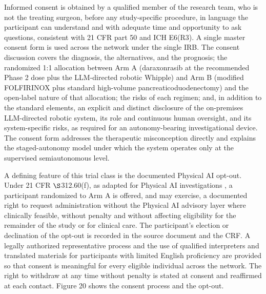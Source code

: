 Informed consent is obtained by a qualified member of the research team, who is not
the treating surgeon, before any study-specific procedure, in language the
participant can understand and with adequate time and opportunity to ask questions,
consistent with 21 CFR part 50 \cite{ecfr2026part50} and ICH E6(R3). A single
master consent form is used across the network under the single IRB. The consent
discussion covers the diagnosis, the alternatives, and the prognosis; the
randomized 1:1 allocation between Arm A (daraxonrasib at the recommended Phase 2
dose plus the LLM-directed robotic Whipple) and Arm B (modified FOLFIRINOX plus
standard high-volume pancreaticoduodenectomy) and the open-label nature of that
allocation; the risks of each regimen; and, in addition to the standard elements,
an explicit and distinct disclosure of the on-premises LLM-directed robotic system,
its role and continuous human oversight, and its system-specific risks, as required
for an autonomy-bearing investigational device. The consent form addresses the
therapeutic misconception directly and explains the staged-autonomy model under
which the system operates only at the supervised semiautonomous level.

A defining feature of this trial class is the documented Physical AI opt-out. Under
21 CFR $\S$312.60(f), as adapted for Physical AI investigations
\cite{kawchak2026adapt312}, a participant randomized to Arm A is offered, and may
exercise, a documented right to request administration without the Physical AI
advisory layer where clinically feasible, without penalty and without affecting
eligibility for the remainder of the study or for clinical care. The participant's
election or declination of the opt-out is recorded in the source document and the
CRF. A legally authorized representative process and the use of qualified
interpreters and translated materials for participants with limited English
proficiency are provided so that consent is meaningful for every eligible individual
across the network. The right to withdraw at any time without penalty is stated at
consent and reaffirmed at each contact. Figure 20 shows the consent process and the
opt-out.

